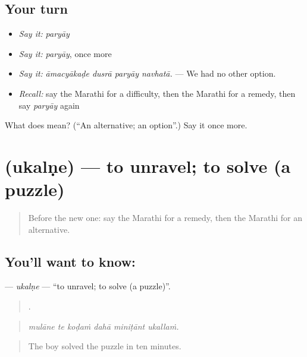 \subsection*{Your turn}
\begin{itemize}
\raggedright
  \item \emph{Say it:} \emph{paryāy}
  \item \emph{Say it:} \emph{paryāy}, once more
  \item \emph{Say it:} \emph{āmacyākaḍe dusrā paryāy navhatā.} — We had no other option.
  \item \emph{Recall:} say the Marathi for a difficulty, then the Marathi for a remedy, then say \emph{paryāy} again
\end{itemize}

\begin{tcolorbox}[breakable,colback=teal!4,colframe=teal!35!black,title={Before you move on}]
What does  mean? (\textquotedblleft{}An alternative; an option\textquotedblright{}.) Say it once more.
\end{tcolorbox}
\section[\texorpdfstring{\mr{उकलणे} (ukalṇe)}{उकलणे (ukalṇe)}]{ (ukalṇe) — to unravel; to solve (a puzzle)}

\label{lesson:MR-C349-ukalne}



\begin{quote}
Before the new one: say the Marathi for a remedy, then the Marathi for an alternative.
\end{quote}

\subsection*{You'll want to know: }
\textbf{} — \emph{ukalṇe} — \textquotedblleft{}to unravel; to solve (a puzzle)\textquotedblright{}.

\begin{quote}
     .
\end{quote}

\begin{quote}
\emph{mulāne te koḍaṁ dahā miniṭānt ukallaṁ.}
\end{quote}

\begin{quote}
The boy solved the puzzle in ten minutes.
\end{quote}

